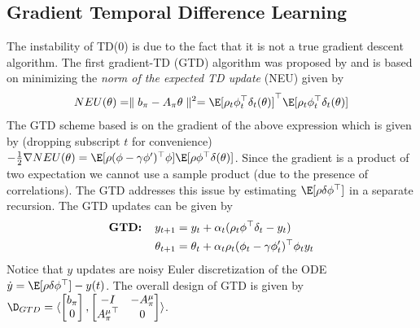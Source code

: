 \subsection{Gradient Temporal Difference Learning}
The instability of TD($0$) is due to the fact that it is not a true gradient descent algorithm. The first gradient-TD (GTD) algorithm was proposed by \citet{sutton2009convergent} and is based on minimizing the \emph{norm of the expected TD update} (NEU) given by
\begin{align}\label{neu}
NEU(\theta)=\parallel b_\pi -A_\pi\theta\parallel^2
=\E[\rho_t\phi_t^\top\delta_t(\theta)]^\top\E[\rho_t\phi_t^\top\delta_t(\theta)]
\end{align}
The GTD scheme based is on the gradient of the above expression which is given by (dropping subscript $t$ for convenience) $-\frac{1}{2}\nabla NEU(\theta)=\E[\rho (\phi-\gamma\phi')^\top \phi]\E[\rho \phi^\top\delta(\theta)]$. Since the gradient is a product of two expectation we cannot use a sample product (due to the presence of correlations). The GTD addresses this issue by estimating $\E[\rho\delta\phi^\top]$ in a separate recursion. The GTD updates can be given by
\begin{align}
\begin{split}
\textbf{GTD:\quad}y_{t+1}&=y_t+\alpha_t(\rho_t\phi^\top\delta_t -y_t)\\
\theta_{t+1}&=\theta_t+\alpha_t\rho_t(\phi_t-\gamma\phi'_t)^\top\phi_ty_t
\end{split}
\end{align}
Notice that $y$ updates are noisy Euler discretization of the ODE $\dot{y}=\E[\rho\delta\phi^\top]-y(t)$. The overall design of GTD is given by $\D_{GTD}=\langle \begin{bmatrix}b_\pi\\ 0\\ \end{bmatrix},\begin{bmatrix}-I &-A^\mu_\pi \\ {A^\mu_\pi}^\top &0 \\ \end{bmatrix}\rangle$.\par
